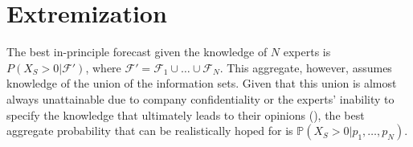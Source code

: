 \documentclass[11pt,twoside]{article}
\renewcommand{\P}{\mathbb{P}}
\theoremstyle{definition}
\theoremstyle{definition}
\begin{document}
%


\section{Extremization}
\label{extremization}
The best in-principle forecast given the knowledge of $N$ experts is $P(X_{S} > 0 |  \mathcal{F}')$, where $\mathcal{F}' = \mathcal{F}_1 \cup \dots \cup \mathcal{F}_N$. This aggregate, however, assumes knowledge of the union of the information sets. Given that this union is almost always unattainable due to company confidentiality or the experts' inability to specify the knowledge that ultimately leads to their opinions (\cite{dawid1995coherent}), the best aggregate probability that can be realistically hoped for is  $\P(X_{S} > 0 | p_1, \dots, p_N)$. 
\end{document}
